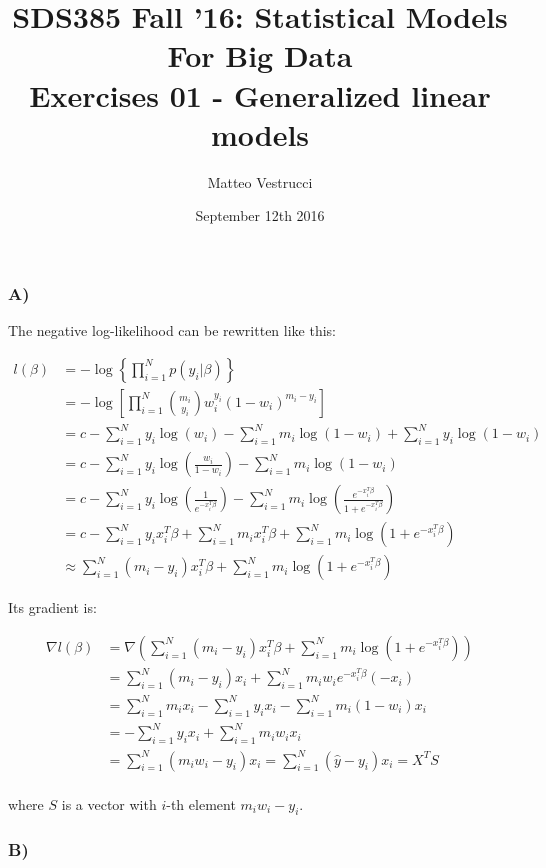 \documentclass{article}
\title{SDS385 Fall '16: Statistical Models For Big Data\\Exercises 01 - Generalized linear models}
\author{Matteo Vestrucci}
\date{September 12th 2016}
\begin{document}
\maketitle
\bigskip\bigskip\bigskip

\subsubsection*{A)}

The negative log-likelihood can be rewritten like this:

\begin{align*}
l(\beta)&=-\log\left\lbrace\prod_{i=1}^N p(y_i|\beta)\right\rbrace\\
		&=-\log\left[\prod_{i=1}^N \binom{m_i}{y_i}w_i^{y_i}(1-w_i)^{m_i-y_i}\right]\\
		&= c-\sum_{i=1}^N y_i \log(w_i)-\sum_{i=1}^N m_i \log(1-w_i)+\sum_{i=1}^N y_i \log(1-w_i)\\
		&= c-\sum_{i=1}^N y_i \log\left(\frac{w_i}{1-w_i}\right)-\sum_{i=1}^N m_i \log(1-w_i)\\
		&= c-\sum_{i=1}^N y_i \log\left(\frac{1}{e^{-x_i^T\beta}}\right)-\sum_{i=1}^N m_i \log\left(\frac{e^{-x_i^T\beta}}{1+e^{-x_i^T\beta}}\right)\\
		&= c-\sum_{i=1}^N y_i x_i^T\beta+\sum_{i=1}^N m_i x_i^T\beta+\sum_{i=1}^N m_i \log(1+e^{-x_i^T\beta})\\
		&\approx\sum_{i=1}^N (m_i-y_i) x_i^T\beta+\sum_{i=1}^N m_i \log(1+e^{-x_i^T\beta})
\end{align*}

\newpage

Its gradient is:

\begin{align*}
\nabla l(\beta)&=\nabla\left(\sum_{i=1}^N (m_i-y_i) x_i^T\beta+\sum_{i=1}^N m_i \log(1+e^{-x_i^T\beta})\right)\\
				&=\sum_{i=1}^N (m_i-y_i) x_i+\sum_{i=1}^N m_i w_i e^{-x_i^T\beta}(-x_i)\\
				&=\sum_{i=1}^N m_i x_i-\sum_{i=1}^N y_i x_i-\sum_{i=1}^N m_i (1-w_i) x_i\\
				&=-\sum_{i=1}^N y_i x_i+\sum_{i=1}^N m_i w_i x_i\\
				&=\sum_{i=1}^N (m_i w_i-y_i)x_i=\sum_{i=1}^N (\hat{y}-y_i)x_i=X^TS\\
\end{align*}

where $S$ is a vector with $i$-th element $m_i w_i-y_i$.

\subsubsection*{B)}
\end{document}
